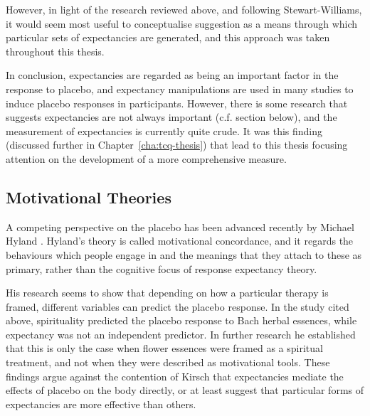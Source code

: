 However, in light of the research reviewed above, and following Stewart-Williams, it would seem most useful to conceptualise suggestion as a means through which particular sets of expectancies are generated, and this approach was taken throughout this thesis. 

In conclusion, expectancies are regarded as being an important factor in the response to placebo, and expectancy manipulations are used in many studies to induce placebo responses in participants. However, there is some research that suggests expectancies are not always important \cite{Geers2005a} (c.f. section below), and the measurement of expectancies is currently quite crude. It was this finding (discussed further in Chapter~\ref{cha:tcq-thesis}) that lead to this thesis focusing attention on the development of a more comprehensive measure. 


\subsection{Motivational Theories}
\label{sec:behav-plac-motiv}

A competing perspective on the placebo has been advanced recently by Michael Hyland \cite{Hyland2006}. Hyland's theory is called motivational concordance, and it regards the behaviours which people engage in and the meanings that they attach to these as primary,  rather than the cognitive focus of response expectancy theory.  

His research seems to show that depending on how a particular therapy is framed, different variables can predict the placebo response.  In the study cited above, spirituality predicted the placebo response to Bach herbal essences, while expectancy was not an independent predictor. In further research \cite{Hyland2007} he established that this is only the case when flower essences were framed as a spiritual treatment, and not when they were described as motivational tools. These findings argue against the contention of Kirsch that expectancies mediate the effects of placebo on the body directly, or at least suggest that particular forms of expectancies are more effective than others. 

